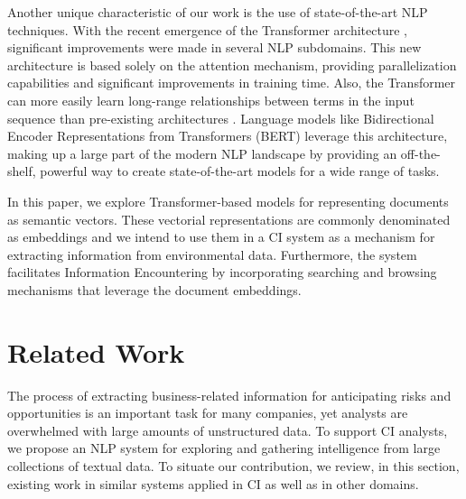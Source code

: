 \documentclass[a4paper]{article}
\begin{document}
Another unique characteristic of our work is the use of state-of-the-art NLP techniques. With the recent emergence of the Transformer architecture \citep{vaswani2017}, significant improvements were made in several NLP subdomains. This new architecture is based solely on the attention mechanism, providing parallelization capabilities and significant improvements in training time. Also, the Transformer can more easily learn long-range relationships between terms in the input sequence than pre-existing architectures \citep{vaswani2017}. Language models like Bidirectional Encoder Representations from Transformers (BERT) \citep{devlin2019} leverage this architecture, making up a large part of the modern NLP landscape by providing an off-the-shelf, powerful way to create state-of-the-art models for a wide range of tasks.

In this paper, we explore Transformer-based models for representing documents as semantic vectors. These vectorial representations are commonly denominated as embeddings and we intend to use them in a CI system as a mechanism for extracting information from environmental data. Furthermore, the system facilitates Information Encountering by incorporating searching and browsing mechanisms that leverage the document embeddings.

\section*{Related Work}
The process of extracting business-related information for anticipating risks and opportunities is an important task for many companies, yet analysts are overwhelmed with large amounts of unstructured data. To support CI analysts, we propose an NLP system for exploring and gathering intelligence from large collections of textual data. To situate our contribution, we review, in this section, existing work in similar systems applied in CI as well as in other domains.
\end{document}
